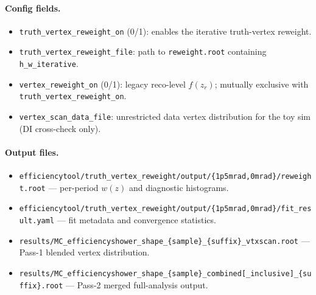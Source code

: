 \documentclass[11pt,a4paper]{article}
\begin{document}
\paragraph{Config fields.}
\begin{itemize}\setlength\itemsep{1pt}
\item \texttt{truth\_vertex\_reweight\_on} (0/1): enables the
  iterative truth-vertex reweight.
\item \texttt{truth\_vertex\_reweight\_file}: path to
  \texttt{reweight.root} containing \texttt{h\_w\_iterative}.
\item \texttt{vertex\_reweight\_on} (0/1): legacy reco-level
  $f(z_r)$; mutually exclusive with \texttt{truth\_vertex\_reweight\_on}.
\item \texttt{vertex\_scan\_data\_file}: unrestricted data vertex
  distribution for the toy sim (DI cross-check only).
\end{itemize}

\paragraph{Output files.}
\begin{itemize}\setlength\itemsep{1pt}
\item \texttt{efficiencytool/truth\_vertex\_reweight/output/\{1p5mrad,0mrad\}/reweight.root}
  --- per-period $w(z)$ and diagnostic histograms.
\item \texttt{efficiencytool/truth\_vertex\_reweight/output/\{1p5mrad,0mrad\}/fit\_result.yaml}
  --- fit metadata and convergence statistics.
\item \texttt{results/MC\_efficiencyshower\_shape\_\{sample\}\_\{suffix\}\_vtxscan.root}
  --- Pass-1 blended vertex distribution.
\item \texttt{results/MC\_efficiencyshower\_shape\_\{sample\}\_combined[\_inclusive]\_\{suffix\}.root}
  --- Pass-2 merged full-analysis output.
\end{itemize}
\end{document}
